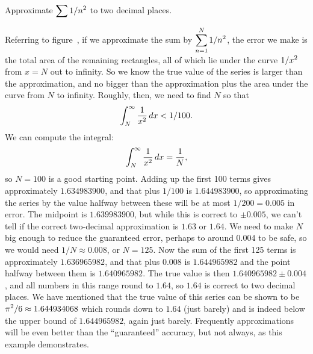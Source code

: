 \begin{example} Approximate $\displaystyle \sum 1/n^2$ to two decimal places.

Referring to figure~,
if we approximate the sum by $\displaystyle \sum_{n=1}^N 1/n^2$, the error we make is the
total area of the remaining rectangles, all of which lie under the
curve $\displaystyle 1/x^2$ from $x=N$ out to infinity. So we know the true value of
the series is larger than the approximation, and no bigger than the
approximation plus the area under the curve from $N$ to
infinity. Roughly, then, we need to find $N$ so that 
$$\int_N^\infty {1\over x^2}\,dx < 1/100.$$
We can compute the integral:
$$\int_N^\infty {1\over x^2}\,dx = {1\over N},$$ 
so $N=100$ is a good starting point.  Adding up the first 100 terms
gives approximately $1.634983900$, and that plus $1/100$ is
$1.644983900$, so approximating the series by the value halfway
between these will be at most $1/200=0.005$ in error.  The midpoint is
$1.639983900$, but while this is correct to $\pm0.005$, we can't tell
if the correct two-decimal approximation is $1.63$ or $1.64$. We need
to make $N$ big enough to reduce the guaranteed error, perhaps to
around $0.004$ to be safe, so we would need $1/N\approx 0.008$, or
$N=125$. Now the sum of the first 125 terms is approximately
$1.636965982$, and that plus $0.008$ is $1.644965982$ and the point
halfway between them is $1.640965982$. The true value is then
$1.640965982\pm 0.004$, and all numbers in this range round to $1.64$,
so $1.64$ is correct to two decimal places. We have mentioned that
the true value of this series can be shown to be $\displaystyle
\pi^2/6\approx1.644934068$ which rounds down to $1.64$ (just barely)
and is indeed below the upper bound of $1.644965982$, again just
barely. Frequently approximations will be even better than the
``guaranteed'' accuracy, but not always, as this example demonstrates.
\end{example}

